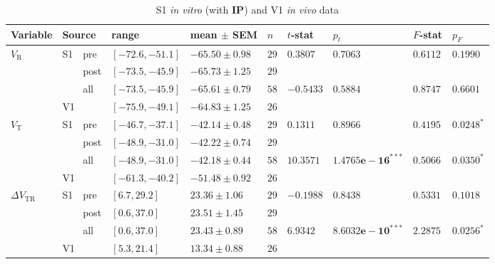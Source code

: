 \documentclass{article}
\begin{document}
\begin{table}[H]
\centering
\caption{S1 \textit{in vitro} (with \textbf{IP}) and V1 \textit{in vivo} data}
    \begin{tabular}{|l|l|l|l|l|l|l|l|l|l|}
        \hline Variable & \multicolumn{2}{l}{Source} & range & mean $\pm$ SEM & $n$ & $t$-stat & $p_t$ & $F$-stat & $p_F$ \\
        \hline
        \multirow{4}{*}{$V_{\mathrm{R}}$}&\multirow{3}{*}{S1}&pre&$[-72.6, -51.1]$&$-65.50 \pm  0.98$&$29$&\multirow{2}{*}{$0.3807$}&\multirow{2}{*}{$0.7063$}&\multirow{2}{*}{$0.6112$}&\multirow{2}{*}{$0.1990$}\\
        & &post&$[-73.5, -45.9]$&$-65.73 \pm  1.25$&$29$& & & & \\
        \cline{7-10} & &all&$[-73.5, -45.9]$&$-65.61 \pm  0.79$&$58$&\multirow{2}{*}{$-0.5433$}&\multirow{2}{*}{$0.5884$}&\multirow{2}{*}{$0.8747$}&\multirow{2}{*}{$0.6601$}\\
        \cline{2-3} &\multicolumn{2}{l|}{V1}&$[-75.9, -49.1]$&$-64.83 \pm  1.25$&$26$& & & & \\\hline
        \multirow{4}{*}{$V_{\mathrm{T}}$}&\multirow{3}{*}{S1}&pre&$[-46.7, -37.1]$&$-42.14 \pm  0.48$&$29$&\multirow{2}{*}{$0.1311$}&\multirow{2}{*}{$0.8966$}&\multirow{2}{*}{$0.4195$}&\multirow{2}{*}{$\mathbf{0.0248}^{*}$}\\
        & &post&$[-48.9, -31.0]$&$-42.22 \pm  0.74$&$29$& & & & \\
        \cline{7-10} & &all&$[-48.9, -31.0]$&$-42.18 \pm  0.44$&$58$&\multirow{2}{*}{$10.3571$}&\multirow{2}{*}{$\mathbf{1.4765e-16}^{***}$}&\multirow{2}{*}{$0.5066$}&\multirow{2}{*}{$\mathbf{0.0350}^{*}$}\\
        \cline{2-3} &\multicolumn{2}{l|}{V1}&$[-61.3, -40.2]$&$-51.48 \pm  0.92$&$26$& & & & \\\hline
        \multirow{4}{*}{$\Delta V_{\mathrm{TR}}$}&\multirow{3}{*}{S1}&pre&$[6.7, 29.2]$&$23.36 \pm  1.06$&$29$&\multirow{2}{*}{$-0.1988$}&\multirow{2}{*}{$0.8438$}&\multirow{2}{*}{$0.5331$}&\multirow{2}{*}{$0.1018$}\\
        & &post&$[0.6, 37.0]$&$23.51 \pm  1.45$&$29$& & & & \\
        \cline{7-10} & &all&$[0.6, 37.0]$&$23.43 \pm  0.89$&$58$&\multirow{2}{*}{$6.9342$}&\multirow{2}{*}{$\mathbf{8.6032e-10}^{***}$}&\multirow{2}{*}{$2.2875$}&\multirow{2}{*}{$\mathbf{0.0256}^{*}$}\\
        \cline{2-3} &\multicolumn{2}{l|}{V1}&$[5.3, 21.4]$&$13.34 \pm  0.88$&$26$& & & & \\\hline
    \end{tabular}
\end{table}
\end{document}
